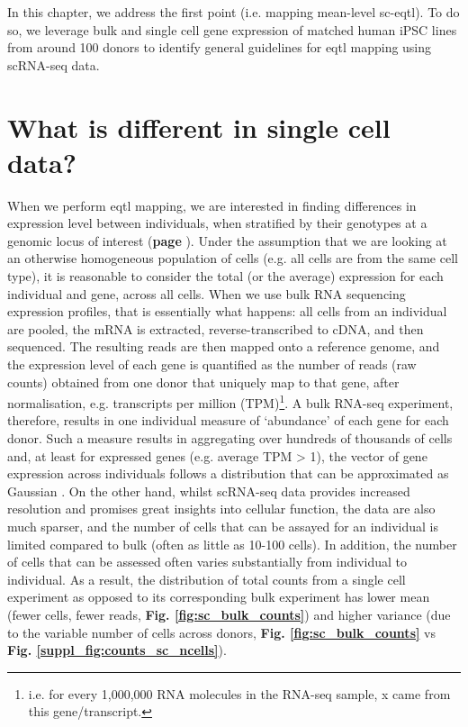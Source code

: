 In this chapter, we address the first point (i.e. mapping mean-level sc-\gls{eqtl}).
To do so, we leverage bulk and single cell gene expression of matched human iPSC lines from around 100 donors to identify general guidelines for \gls{eqtl} mapping using scRNA-seq data.

\newpage

\section{What is different in single cell data?}

When we perform \gls{eqtl} mapping, we are interested in finding differences in expression level between individuals, when stratified by their genotypes at a genomic locus of interest (\textbf{page \pageref{fig:eqtl}}). 
Under the assumption that we are looking at an otherwise homogeneous population of cells (e.g. all cells are from the same cell type), it is reasonable to consider the total (or the average) expression for each individual and gene, across all cells.
When we use bulk RNA sequencing expression profiles, that is essentially what happens: all cells from an individual are pooled, the mRNA is extracted, reverse-transcribed to cDNA, and then sequenced. 
The resulting reads are then mapped onto a reference genome, and the expression level of each gene is quantified as the number of reads (raw counts) obtained from one donor that uniquely map to that gene, after normalisation, e.g. transcripts per million (TPM)\footnote{i.e. for every 1,000,000 RNA molecules in the RNA-seq sample, x came from this gene/transcript.}. 
A bulk RNA-seq experiment, therefore, results in one individual measure of `abundance' of each gene for each donor. 
Such a measure results in aggregating over hundreds of thousands of cells and, at least for expressed genes (e.g. average TPM > 1), the vector of gene expression across individuals follows a distribution that can be approximated as Gaussian \cite{piras2015reduction}.
On the other hand, whilst scRNA-seq data provides increased resolution and promises great insights into cellular function, the data are also much sparser, and the number of cells that can be assayed for an individual is limited compared to bulk (often as little as 10-100 cells). 
In addition, the number of cells that can be assessed often varies substantially from individual to individual.
As a result, the distribution of total counts from a single cell experiment as opposed to its corresponding bulk experiment has lower mean (fewer cells, fewer reads, \textbf{Fig. \ref{fig:sc_bulk_counts}}) and higher variance (due to the variable number of cells across donors, \textbf{Fig. \ref{fig:sc_bulk_counts}} vs \textbf{Fig. \ref{suppl_fig:counts_sc_ncells}}).

